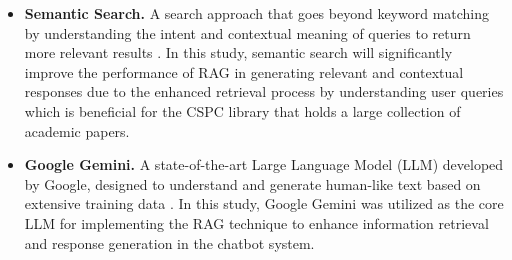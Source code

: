 \begin{refsection}
\begin{itemize}
    \item \textbf{Semantic Search.} A search approach that goes beyond keyword matching by understanding the intent and contextual meaning of queries to return more relevant results \cite{mahboub2024evaluation}. In this study, semantic search will significantly improve the performance of RAG in generating relevant and contextual responses due to the enhanced retrieval process by understanding user queries which is beneficial for the CSPC library that holds a large collection of academic papers.
   
    \item \textbf{Google Gemini.} A state-of-the-art Large Language Model (LLM) developed by Google, designed to understand and generate human-like text based on extensive training data \cite{lee2025gemini}. In this study, Google Gemini was utilized as the core LLM for implementing the RAG technique to enhance information retrieval and response generation in the chatbot system.
\end{itemize}

\clearpage

\printbibliography[heading=subbibintoc, title={\centering Notes}]
\end{refsection}

